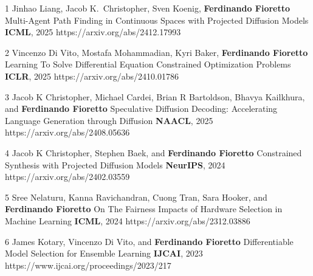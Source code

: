 \documentclass[localFont,alternative]{metadataShortBio}
\begin{document}
{
\begin{pubs}
\confentryShort
	{1}
	{{Jinhao Liang}, {Jacob K.~Christopher}, {Sven Koenig}, {\bf Ferdinando Fioretto}}
	{Multi-Agent Path Finding in Continuous Spaces with Projected Diffusion Models}
	{\textbf{ICML}, 2025}
	{{https://arxiv.org/abs/2412.17993}}

	\confentryShort
	{2}
	{{Vincenzo Di Vito}, Mostafa Mohammadian, Kyri Baker, {\bf Ferdinando Fioretto}}
	{Learning To Solve Differential Equation Constrained Optimization Problems}
	{\textbf{ICLR}, 2025}
	{https://arxiv.org/abs/2410.01786}

	\confentryShort
	{3}
	{Jacob K Christopher, Michael Cardei, Brian R Bartoldson, Bhavya Kailkhura, and {\bf Ferdinando Fioretto}}
	{Speculative Diffusion Decoding: Accelerating Language Generation through Diffusion}
	{\textbf{NAACL}, 2025}
	{https://arxiv.org/abs/2408.05636}
	
	\confentryShort
	{4}
	{Jacob K Christopher, Stephen Baek, and {\bf Ferdinando Fioretto}}
	{Constrained Synthesis with Projected Diffusion Models}
	{\textbf{NeurIPS}, 2024}
	{https://arxiv.org/abs/2402.03559}

	\confentryShort
  {5} %
	{Sree Nelaturu, Kanna Ravichandran, Cuong Tran, Sara Hooker, and {\bf Ferdinando Fioretto}}
	{On The Fairness Impacts of Hardware Selection in Machine Learning}
  {\textbf{ICML}, 2024}
	{https://arxiv.org/abs/2312.03886}


	\confentryShort
	{6}
	{James Kotary, Vincenzo Di Vito, and {\bf Ferdinando Fioretto}}
	{Differentiable Model Selection for Ensemble Learning}
	{\textbf{IJCAI}, 2023}
	{https://www.ijcai.org/proceedings/2023/217}




\end{pubs}
}
\end{document}
